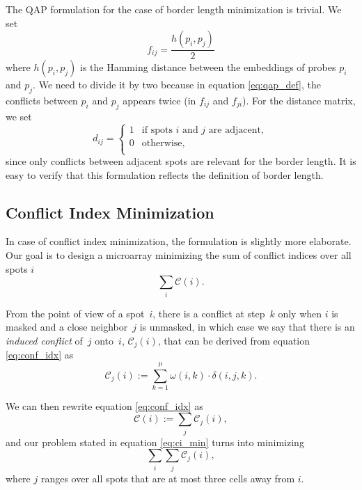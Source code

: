 \documentclass{bioinfo}
\begin{document}
The QAP formulation for the case of border length minimization is trivial. We set
\begin{equation}
f_{ij} = \frac{h(p_i, p_j)}{2}
\end{equation}
where $h(p_i, p_j)$ is the Hamming distance between the embeddings of probes $p_i$ and $p_j$. We need to divide it by two because in equation \ref{eq:qap_def}, the conflicts between $p_i$ and $p_j$ appears twice (in $f_{ij}$ and $f_{ji}$). For the distance matrix, we set
\begin{equation}
d_{ij} =
	\left\{
		\begin{array}{ll}
			1 & \mbox{if spots $i$ and $j$ are adjacent}, \\
			0 & \mbox{otherwise}, \\
		\end{array}
	\right.
\end{equation}
since only conflicts between adjacent spots are relevant for the border length. It is easy to verify that this formulation reflects the definition of border length.

\subsection{Conflict Index Minimization}

In case of conflict index minimization, the formulation is slightly more elaborate. Our goal is to design a microarray minimizing the sum of conflict indices over all spots $i$
\begin{equation}
\label{eq:ci_min}
\sum_{i} \mathcal{C}(i).
\end{equation}

From the point of view of a spot~$i$, there is a conflict at step~$k$ only when $i$ is masked and a close neighbor~$j$ is unmasked, in which case we say that there is an \emph{induced conflict} of~$j$ onto~$i$, $\mathcal{C}_{j}(i)$, that can be derived from equation \ref{eq:conf_idx} as
\begin{equation}
\label{eq:induced_conf_idx}
\mathcal{C}_{j}(i) := \sum_{k=1}^{\mu} \omega(i,k) \cdot \delta(i,j,k).
\end{equation}

We can then rewrite equation \ref{eq:conf_idx} as
\begin{equation}
\mathcal{C}(i) := \sum_{j} \mathcal{C}_{j}(i),
\end{equation}
and our problem stated in equation \ref{eq:ci_min} turns into minimizing
\begin{equation}
\label{eq:ci_min_qap}
\sum_{i} \sum_{j} \mathcal{C}_{j}(i),
\end{equation}
where $j$ ranges over all spots that are at most three cells away from $i$.
\end{document}
